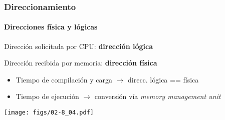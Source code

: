 \documentclass[letter]{beamer}
\begin{document}
\begin{frame}
  \frametitle{Direccionamiento}
  \framesubtitle{Direcciones física y lógicas}

  Dirección solicitada por CPU: {\bf dirección lógica}
  
  Dirección recibida por memoria: {\bf dirección física}
  

  \begin{itemize}
    \item <3-> Tiempo de compilación y carga $\to$ direcc. lógica == física
    \item <4-> Tiempo de ejecución $\to$ conversión vía {\em memory management unit}
  \end{itemize}

  \begin{center}
    \texttt{[image: figs/02-8\_04.pdf]}
  \end{center}

\end{frame}
\end{document}
